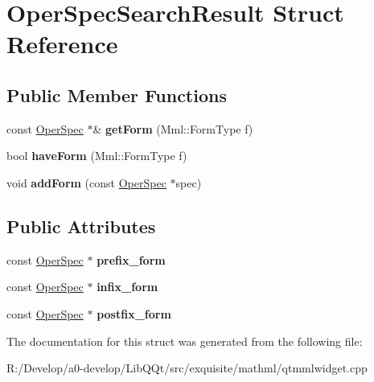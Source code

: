\hypertarget{struct_oper_spec_search_result}{}\section{Oper\+Spec\+Search\+Result Struct Reference}
\label{struct_oper_spec_search_result}
\subsection*{Public Member Functions}
\begin{DoxyCompactItemize}
\item 
\mbox{\label{struct_oper_spec_search_result_a0d862df612e9dd2317b21cf0422e3d03}} 
const \mbox{\hyperlink{struct_oper_spec}{Oper\+Spec}} $\ast$\& {\bfseries get\+Form} (Mml\+::\+Form\+Type f)
\item 
\mbox{\label{struct_oper_spec_search_result_ad5502448669167fa0a65940ddb56b380}} 
bool {\bfseries have\+Form} (Mml\+::\+Form\+Type f)
\item 
\mbox{\label{struct_oper_spec_search_result_a0d0f9a17b0851379e9798b9b649a8ced}} 
void {\bfseries add\+Form} (const \mbox{\hyperlink{struct_oper_spec}{Oper\+Spec}} $\ast$spec)
\end{DoxyCompactItemize}
\subsection*{Public Attributes}
\begin{DoxyCompactItemize}
\item 
\mbox{\label{struct_oper_spec_search_result_af96fc41856c87c8700a8734b5e9b7c95}} 
const \mbox{\hyperlink{struct_oper_spec}{Oper\+Spec}} $\ast$ {\bfseries prefix\+\_\+form}
\item 
\mbox{\label{struct_oper_spec_search_result_a460e156a34a13ff47d546c4ef8c2b966}} 
const \mbox{\hyperlink{struct_oper_spec}{Oper\+Spec}} $\ast$ {\bfseries infix\+\_\+form}
\item 
\mbox{\label{struct_oper_spec_search_result_a1aafbeb8f5a9f242b18829330669efca}} 
const \mbox{\hyperlink{struct_oper_spec}{Oper\+Spec}} $\ast$ {\bfseries postfix\+\_\+form}
\end{DoxyCompactItemize}


The documentation for this struct was generated from the following file\+:\begin{DoxyCompactItemize}
\item 
R\+:/\+Develop/a0-\/develop/\+Lib\+Q\+Qt/src/exquisite/mathml/qtmmlwidget.\+cpp\end{DoxyCompactItemize}
